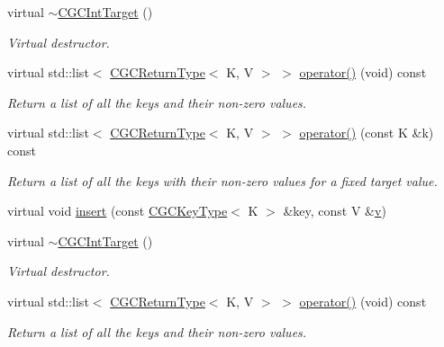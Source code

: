 \begin{DoxyCompactItemize}
\item 
virtual \mbox{\hyperlink{classHadron_1_1CGCIntTarget_a6b808ca161d3dae62109495144178541}{$\sim$\+C\+G\+C\+Int\+Target}} ()
\begin{DoxyCompactList}\small\item\em Virtual destructor. \end{DoxyCompactList}\item 
virtual std\+::list$<$ \mbox{\hyperlink{structHadron_1_1CGCReturnType}{C\+G\+C\+Return\+Type}}$<$ K, V $>$ $>$ \mbox{\hyperlink{classHadron_1_1CGCIntTarget_ae6c0ce90fe1f8a2880984df1e2e44c18}{operator()}} (void) const
\begin{DoxyCompactList}\small\item\em Return a list of all the keys and their non-\/zero values. \end{DoxyCompactList}\item 
virtual std\+::list$<$ \mbox{\hyperlink{structHadron_1_1CGCReturnType}{C\+G\+C\+Return\+Type}}$<$ K, V $>$ $>$ \mbox{\hyperlink{classHadron_1_1CGCIntTarget_a5946627ddb796961b97b7e0c57e32d83}{operator()}} (const K \&k) const
\begin{DoxyCompactList}\small\item\em Return a list of all the keys with their non-\/zero values for a fixed target value. \end{DoxyCompactList}\item 
virtual void \mbox{\hyperlink{classHadron_1_1CGCIntTarget_a2c1e2eaf068abdc394ba3326c7770e77}{insert}} (const \mbox{\hyperlink{structHadron_1_1CGCKeyType}{C\+G\+C\+Key\+Type}}$<$ K $>$ \&key, const V \&\mbox{\hyperlink{hadron__timeslice_8cc_a716fc87f5e814be3ceee2405ed6ff22a}{v}})
\item 
virtual \mbox{\hyperlink{classHadron_1_1CGCIntTarget_a6b808ca161d3dae62109495144178541}{$\sim$\+C\+G\+C\+Int\+Target}} ()
\begin{DoxyCompactList}\small\item\em Virtual destructor. \end{DoxyCompactList}\item 
virtual std\+::list$<$ \mbox{\hyperlink{structHadron_1_1CGCReturnType}{C\+G\+C\+Return\+Type}}$<$ K, V $>$ $>$ \mbox{\hyperlink{classHadron_1_1CGCIntTarget_ae6c0ce90fe1f8a2880984df1e2e44c18}{operator()}} (void) const
\begin{DoxyCompactList}\small\item\em Return a list of all the keys and their non-\/zero values. \end{DoxyCompactList}\item 

\end{DoxyCompactItemize}
